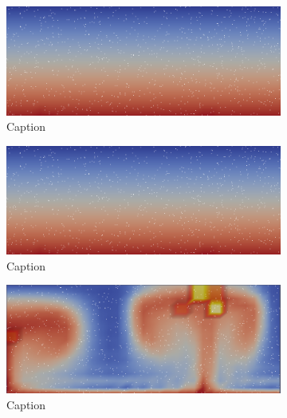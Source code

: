 \begin{figure}
    \centering
    \begin{subfigure}{0.49\textwidth}
        \centering
        \includegraphics[width=\textwidth]{figures/box_batch0.png}
        \caption{Caption}
        \label{fig:my_label}
    \end{subfigure}
    \hfill
    \begin{subfigure}{0.49\textwidth}
        \centering
        \includegraphics[width=\textwidth]{figures/box_batch0.png}
        \caption{Caption}
        \label{fig:my_label}
    \end{subfigure}
    \begin{subfigure}{0.49\textwidth}
        \centering
        \includegraphics[width=\textwidth]{figures/box_batch38.png}
        \caption{Caption}
        \label{fig:my_label}
    \end{subfigure}
    \hfill
    \begin{subfigure}{0.49\textwidth}

\end{subfigure}
\end{figure}
